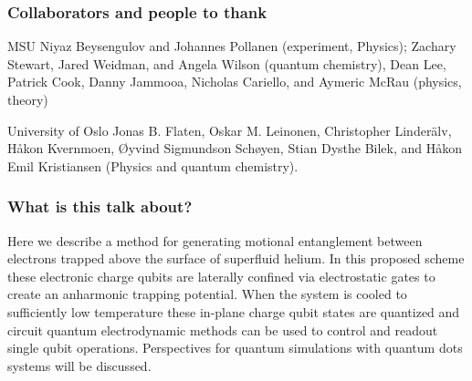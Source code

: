 \documentclass{beamer}
\begin{document}
\begin{frame}
\frametitle{Collaborators and people to thank}

\begin{block}{MSU }
Niyaz Beysengulov and Johannes Pollanen (experiment, Physics); Zachary Stewart, Jared Weidman, and Angela Wilson (quantum chemistry), Dean Lee, Patrick Cook, Danny Jammooa, Nicholas Cariello, and Aymeric McRau (physics, theory)
\end{block}
\begin{block}{University of Oslo }
Jonas B. Flaten, Oskar M. Leinonen, Christopher Linder\"alv, H\aa kon Kvernmoen, \O yvind Sigmundson Sch\o yen, Stian Dysthe Bilek, and H\aa kon Emil Kristiansen (Physics and quantum chemistry).
\end{block}
\end{frame}

\begin{frame}
\frametitle{What is this talk about?}
\begin{block}{}
Here we describe a method for generating motional entanglement between
electrons trapped above the surface of superfluid helium. In this
proposed scheme these electronic charge qubits are laterally confined
via electrostatic gates to create an anharmonic trapping
potential. When the system is cooled to sufficiently low temperature
these in-plane charge qubit states are quantized and circuit quantum
electrodynamic methods can be used to control and readout single qubit
operations. Perspectives for quantum simulations with quantum dots
systems will be discussed.
\end{block}
\end{frame}
\end{document}
